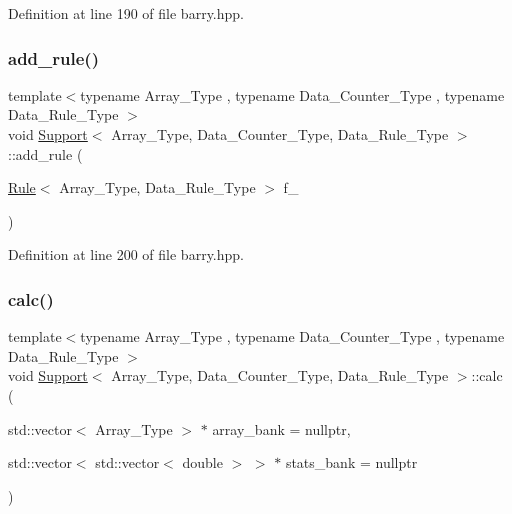 Definition at line 190 of file barry.\+hpp.

\mbox{\label{classbarry_1_1_support_aa817cb5d6c48dda3ecfeef2c5897b537}} 
\subsubsection{\texorpdfstring{add\+\_\+rule()}{add\_rule()}\hspace{0.1cm}{\footnotesize\ttfamily [2/2]}}
{\footnotesize\ttfamily template$<$typename Array\+\_\+\+Type , typename Data\+\_\+\+Counter\+\_\+\+Type , typename Data\+\_\+\+Rule\+\_\+\+Type $>$ \\
void \hyperlink{classbarry_1_1_support}{Support}$<$ Array\+\_\+\+Type, Data\+\_\+\+Counter\+\_\+\+Type, Data\+\_\+\+Rule\+\_\+\+Type $>$\+::add\+\_\+rule (\begin{DoxyParamCaption}\item[{\hyperlink{classbarry_1_1_rule}{Rule}$<$ Array\+\_\+\+Type, Data\+\_\+\+Rule\+\_\+\+Type $>$}]{f\+\_\+ }\end{DoxyParamCaption})\hspace{0.3cm}{\ttfamily [inline]}}



Definition at line 200 of file barry.\+hpp.

\mbox{\label{classbarry_1_1_support_afa36b8c1348e28c51296379157f58081}} 
\subsubsection{\texorpdfstring{calc()}{calc()}}
{\footnotesize\ttfamily template$<$typename Array\+\_\+\+Type , typename Data\+\_\+\+Counter\+\_\+\+Type , typename Data\+\_\+\+Rule\+\_\+\+Type $>$ \\
void \hyperlink{classbarry_1_1_support}{Support}$<$ Array\+\_\+\+Type, Data\+\_\+\+Counter\+\_\+\+Type, Data\+\_\+\+Rule\+\_\+\+Type $>$\+::calc (\begin{DoxyParamCaption}\item[{std\+::vector$<$ Array\+\_\+\+Type $>$ $\ast$}]{array\+\_\+bank = {\ttfamily nullptr},  }\item[{std\+::vector$<$ std\+::vector$<$ double $>$ $>$ $\ast$}]{stats\+\_\+bank = {\ttfamily nullptr} }\end{DoxyParamCaption})\hspace{0.3cm}{\ttfamily [inline]}}




